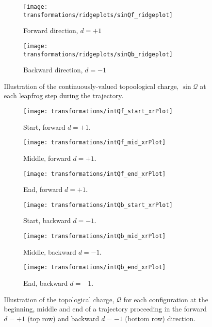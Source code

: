 %
\begin{figure}[htpb]
  \centering
  \begin{subfigure}{0.48\textwidth}
    \texttt{[image: transformations/ridgeplots/sinQf\_ridgeplot]}
    \caption{Forward direction, \(d = +1\)}
  \end{subfigure}
  \begin{subfigure}{0.48\textwidth}
    \texttt{[image: transformations/ridgeplots/sinQb\_ridgeplot]}
    \caption{Backward direction, \(d = -1\)}
  \end{subfigure}
  \caption{Illustration of the continuously-valued topoological charge,
  \(\sin\mathcal{Q}\) at each leapfrog step during the trajectory.}%
  \label{fig:sinQ_ridgeplots}
\end{figure}
%
\begin{figure}[htpb]
  \centering
  \begin{subfigure}{0.31\textwidth}
    \texttt{[image: transformations/intQf\_start\_xrPlot]}
    \caption{Start, forward \(d=+1\).}
  \end{subfigure}
  \begin{subfigure}{0.31\textwidth}
    \texttt{[image: transformations/intQf\_mid\_xrPlot]}
    \caption{Middle, forward \(d=+1\).}
  \end{subfigure}
  \begin{subfigure}{0.31\textwidth}
    \texttt{[image: transformations/intQf\_end\_xrPlot]}
    \caption{End, forward \(d=+1\).}
  \end{subfigure}
  \begin{subfigure}{0.31\textwidth}
    \texttt{[image: transformations/intQb\_start\_xrPlot]}
    \caption{Start, backward \(d=-1\).}
  \end{subfigure}
  \begin{subfigure}{0.31\textwidth}
    \texttt{[image: transformations/intQb\_mid\_xrPlot]}
    \caption{Middle, backward \(d=-1\).}
  \end{subfigure}
  \begin{subfigure}{0.31\textwidth}
    \texttt{[image: transformations/intQb\_end\_xrPlot]}
    \caption{End, backward \(d=-1\).}
  \end{subfigure}
  \caption{Illustration of the topological charge, \(\mathcal{Q}\) for each 
  configuration at the beginning, middle and end of a trajectory proceeding in
  the forward \(d = +1\) (top row) and backward \(d = -1\) (bottom row)
  direction.}
\end{figure}

